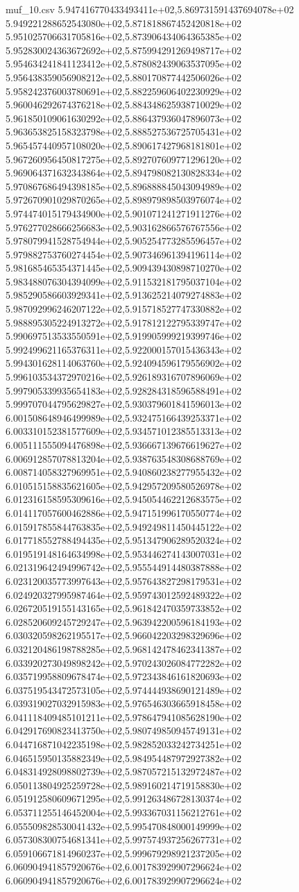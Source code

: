 \begin{filecontents*}{muf_10.csv}
5.947416770433493411e+02,5.869731591437694078e+02
5.949221288652543080e+02,5.871818867452420818e+02
5.951025706631705816e+02,5.873906434064365385e+02
5.952830024363672692e+02,5.875994291269498717e+02
5.954634241841123412e+02,5.878082439063537095e+02
5.956438359056908212e+02,5.880170877442506026e+02
5.958242376003780691e+02,5.882259606402230929e+02
5.960046292674376218e+02,5.884348625938710029e+02
5.961850109061630292e+02,5.886437936047896073e+02
5.963653825158323798e+02,5.888527536725705431e+02
5.965457440957108020e+02,5.890617427968181801e+02
5.967260956450817275e+02,5.892707609771296120e+02
5.969064371632343864e+02,5.894798082130828334e+02
5.970867686494398185e+02,5.896888845043094989e+02
5.972670901029870265e+02,5.898979898503976074e+02
5.974474015179434900e+02,5.901071241271911276e+02
5.976277028666256683e+02,5.903162866576767556e+02
5.978079941528754944e+02,5.905254773285596457e+02
5.979882753760274454e+02,5.907346961394196114e+02
5.981685465354371445e+02,5.909439430898710270e+02
5.983488076304394099e+02,5.911532181795037104e+02
5.985290586603929341e+02,5.913625214079274883e+02
5.987092996246207122e+02,5.915718527747330882e+02
5.988895305224913272e+02,5.917812122795339747e+02
5.990697513533550591e+02,5.919905999219399746e+02
5.992499621165376311e+02,5.922000157015436343e+02
5.994301628114063760e+02,5.924094596179556902e+02
5.996103534372970216e+02,5.926189316707896069e+02
5.997905339935654183e+02,5.928284318596588491e+02
5.999707044795629827e+02,5.930379601841596013e+02
6.001508648946499989e+02,5.932475166439253371e+02
6.003310152381577609e+02,5.934571012385513313e+02
6.005111555094476898e+02,5.936667139676619627e+02
6.006912857078813204e+02,5.938763548308688769e+02
6.008714058327969951e+02,5.940860238277955432e+02
6.010515158835621605e+02,5.942957209580526978e+02
6.012316158595309616e+02,5.945054462212683575e+02
6.014117057600462886e+02,5.947151996170550774e+02
6.015917855844763835e+02,5.949249811450445122e+02
6.017718552788494435e+02,5.951347906289520324e+02
6.019519148164634998e+02,5.953446274143007031e+02
6.021319642494996742e+02,5.955544914480387888e+02
6.023120035773997643e+02,5.957643827298179531e+02
6.024920327995987464e+02,5.959743012592489322e+02
6.026720519155143165e+02,5.961842470359733852e+02
6.028520609245729247e+02,5.963942200596184193e+02
6.030320598262195517e+02,5.966042203298329696e+02
6.032120486198788285e+02,5.968142478462341387e+02
6.033920273049898242e+02,5.970243026084772282e+02
6.035719958809678474e+02,5.972343846161820693e+02
6.037519543472573105e+02,5.974444938690121489e+02
6.039319027032915983e+02,5.976546303665918458e+02
6.041118409485101211e+02,5.978647941085628190e+02
6.042917690823413750e+02,5.980749850945749131e+02
6.044716871042235198e+02,5.982852033242734251e+02
6.046515950135882349e+02,5.984954487972927382e+02
6.048314928098802739e+02,5.987057215132972487e+02
6.050113804925259728e+02,5.989160214719158830e+02
6.051912580609671295e+02,5.991263486728130374e+02
6.053711255146452004e+02,5.993367031156212761e+02
6.055509828530041432e+02,5.995470848000149999e+02
6.057308300754681341e+02,5.997574937256267731e+02
6.059106671814960237e+02,5.999679298921237205e+02
6.060904941857920676e+02,6.001783929907296624e+02
6.060904941857920676e+02,6.001783929907296624e+02
\end{filecontents*}


